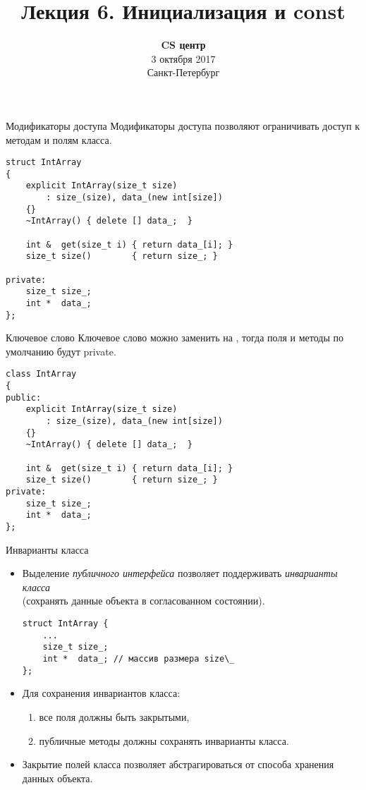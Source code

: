\documentclass{beamer}
\title{Лекция 6. Инициализация и const}
\date{
   \textbf{CS центр}\\
   3 октября 2017 \\
   Санкт-Петербург
}
\begin{document}
\begin{frame} 
  \titlepage
\end{frame}

\begin{frame}[fragile]{Модификаторы доступа}{}
    Модификаторы доступа позволяют ограничивать 
    доступ к методам и полям класса.
\begin{lstlisting}
struct IntArray 
{
    explicit IntArray(size_t size) 
        : size_(size), data_(new int[size]) 
    {}
    ~IntArray() { delete [] data_;  }

    int &  get(size_t i) { return data_[i]; }
    size_t size()        { return size_; }

private:
    size_t size_;
    int *  data_;
};
\end{lstlisting}
\end{frame}

\begin{frame}[fragile]{Ключевое слово }{}
    Ключевое слово  можно заменить на 
    , тогда поля и методы
    по умолчанию будут private.

\begin{lstlisting}
class IntArray 
{
public:
    explicit IntArray(size_t size) 
        : size_(size), data_(new int[size]) 
    {}
    ~IntArray() { delete [] data_;  }

    int &  get(size_t i) { return data_[i]; }
    size_t size()        { return size_; }
private:
    size_t size_;
    int *  data_;
};
\end{lstlisting}
\end{frame}

\begin{frame}[fragile]{Инварианты класса}{}
    \begin{itemize}
        \item Выделение {\em публичного интерфейса} позволяет
            поддерживать {\em инварианты класса}\\
            (сохранять
            данные объекта в согласованном состоянии).
\begin{lstlisting}
struct IntArray {
    ...
    size_t size_;
    int *  data_; // массив размера size\_
};
\end{lstlisting}
        
        \item Для сохранения инвариантов класса:
            \begin{enumerate}
                \item все поля должны быть закрытыми, 
                \item публичные методы должны сохранять инварианты класса.
            \end{enumerate}

        \item Закрытие полей класса позволяет абстрагироваться 
            от способа хранения данных объекта.
    \end{itemize}
\end{frame}
\end{document}
